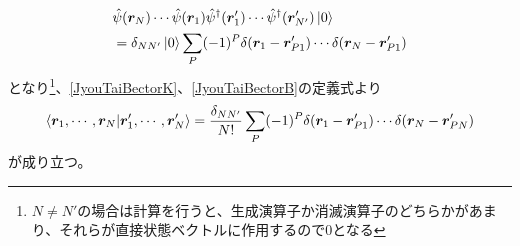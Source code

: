 \documentclass[dvipdfmx, 11pt, a4paper]{jsarticle}
\theoremstyle{definition}
\numberwithin{equation}{section}
\begin{document}
\begin{derivationBox}
        \begin{align}
            &\hat{\psi}(\bm{r}_N)\cdots\hat{\psi}(\bm{r}_1) \hat{\psi}^\dagger(\bm{r}'_1)\cdots\hat{\psi}^\dagger(\bm{r}'_{N'})\ket{0} \notag \\
            &= \delta_{NN'}\ket{0}\sum_P (-1)^P \delta(\bm{r}_1-\bm{r}'_{P1})\cdots \delta(\bm{r}_N-\bm{r}'_{P1})
        \end{align}
        となり\footnote{$N\ne N'$の場合は計算を行うと、生成演算子か消滅演算子のどちらかがあまり、それらが直接状態ベクトルに作用するので0となる}、\eqref{JyouTaiBectorK}、\eqref{JyouTaiBectorB}の定義式より
        \begin{align}
            \braket{\bm{r}_1,\cdots,\bm{r}_N|{\bm{r}'_1,\cdots,\bm{r}'_N}} = \frac{\delta_{NN'}}{N!}\sum_P (-1)^P \delta(\bm{r}_1-\bm{r}'_{P1})\cdots\delta(\bm{r}_N-\bm{r}'_{PN})
        \end{align}
        が成り立つ。
    \end{derivationBox}
\end{document}
